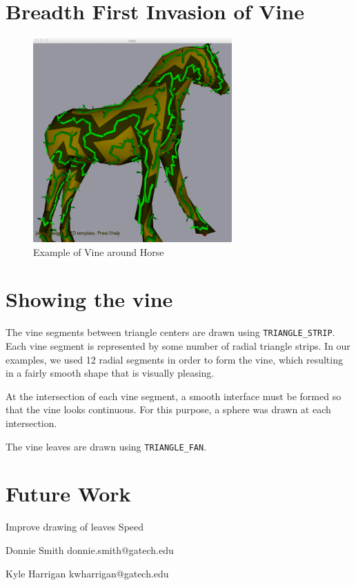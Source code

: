 \documentclass[letterpaper,10pt]{IEEEtran}
\begin{document}
\section{Breadth First Invasion of Vine}


\begin{figure}[!h]
\centering
\includegraphics[width=3in]{data/vine}
\caption{Example of Vine around Horse}
\label{fig_angle}
\end{figure}

\section{Showing the vine}

The vine segments between triangle centers are drawn using  \verb+TRIANGLE_STRIP+.  Each vine segment is represented by some number of radial triangle strips.  In our examples, we used 12 radial segments in order to form the vine, which resulting in a fairly smooth shape that is visually pleasing.  

At the intersection of each vine segment, a smooth interface must be formed so that the vine looks continuous.  For this purpose, a sphere was drawn at each intersection. 

The vine leaves are drawn using \verb+TRIANGLE_FAN+. 

\section{Future Work}

Improve drawing of leaves
Speed


\begin{IEEEbiography}{Donnie Smith} donnie.smith@gatech.edu
\end{IEEEbiography}

\begin{IEEEbiography}{Kyle Harrigan} kwharrigan@gatech.edu
\end{IEEEbiography}
\end{document}
